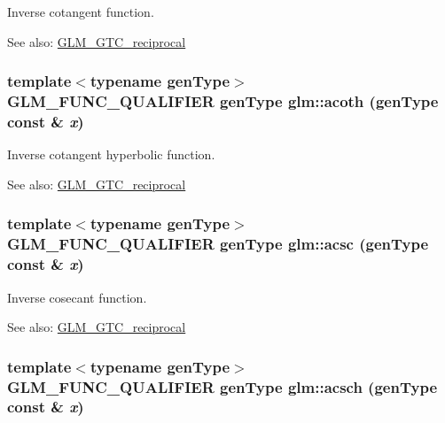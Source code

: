 Inverse cotangent function.

\begin{Desc}
\item[See also:]\hyperlink{group__gtc__reciprocal}{GLM\_\-GTC\_\-reciprocal} \end{Desc}
\hypertarget{group__gtc__reciprocal_g651e435e3e8f63b1ea1da0e5e7581864}{
\subsubsection[acoth]{\setlength{\rightskip}{0pt plus 5cm}template$<$typename genType$>$ GLM\_\-FUNC\_\-QUALIFIER genType glm::acoth (genType const \& {\em x})}}
\label{group__gtc__reciprocal_g651e435e3e8f63b1ea1da0e5e7581864}


Inverse cotangent hyperbolic function.

\begin{Desc}
\item[See also:]\hyperlink{group__gtc__reciprocal}{GLM\_\-GTC\_\-reciprocal} \end{Desc}
\hypertarget{group__gtc__reciprocal_g921be8522fbf0a5cfc877e78fb9abed2}{
\subsubsection[acsc]{\setlength{\rightskip}{0pt plus 5cm}template$<$typename genType$>$ GLM\_\-FUNC\_\-QUALIFIER genType glm::acsc (genType const \& {\em x})}}
\label{group__gtc__reciprocal_g921be8522fbf0a5cfc877e78fb9abed2}


Inverse cosecant function.

\begin{Desc}
\item[See also:]\hyperlink{group__gtc__reciprocal}{GLM\_\-GTC\_\-reciprocal} \end{Desc}
\hypertarget{group__gtc__reciprocal_gb24c5c23d9d3d10517ad80f5af515b0e}{
\subsubsection[acsch]{\setlength{\rightskip}{0pt plus 5cm}template$<$typename genType$>$ GLM\_\-FUNC\_\-QUALIFIER genType glm::acsch (genType const \& {\em x})}}
\label{group__gtc__reciprocal_gb24c5c23d9d3d10517ad80f5af515b0e}


